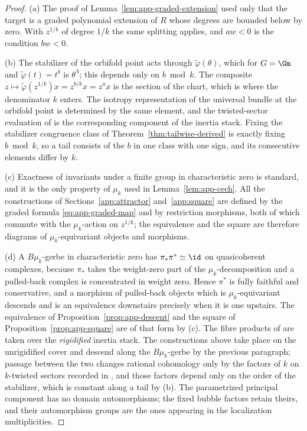 \begin{proof}
(a)  The proof of Lemma~\ref{lem:app-graded-extension} used only that the
target is a graded polynomial extension of \(R\) whose degrees are bounded
below by zero.  With \(z^{1/k}\) of degree \(1/k\) the same splitting applies,
and \(aw<0\) is the condition \(bw<0\).

(b)  The stabilizer of the orbifold point acts through
\(\widetilde\varphi(\theta)\), which for \(G=\Gm\) and
\(\widetilde\varphi(t)=t^{b}\) is \(\theta^{\,b}\); this depends only on
\(b\bmod k\).  The composite
\(z\mapsto\widetilde\varphi(z^{1/k})x=z^{b/k}x=z^ax\) is the section of the
chart, which is where the denominator \(k\) enters.  The isotropy representation of the universal bundle at the
orbifold point is determined by the same element, and the twisted-sector
evaluation of \cite[Corollary~9.10]{WoodwardQKIII} is the corresponding
component of the inertia stack.  Fixing the stabilizer congruence class of
Theorem~\ref{thm:tailwise-derived} is exactly fixing \(b\bmod k\), so a tail
consists of the \(b\) in one class with one sign, and its consecutive elements
differ by \(k\).

(c)  Exactness of invariants under a finite group in characteristic zero is
standard, and it is the only property of \(\mu_k\) used in
Lemma~\ref{lem:app-cech}.  All the constructions of
Sections~\ref{app:attractor} and~\ref{app:square} are defined by the graded
formula \eqref{eq:app-graded-map} and by restriction morphisms, both of which
commute with the \(\mu_k\)-action on \(z^{1/k}\); the equivalence and the
square are therefore diagrams of \(\mu_k\)-equivariant objects and morphisms.

(d)  A \(B\mu_k\)-gerbe in characteristic zero has \(\pi_*\pi^*\simeq\id\) on
quasicoherent complexes, because \(\pi_*\) takes the weight-zero part of the
\(\mu_k\)-decomposition and a pulled-back complex is concentrated in weight
zero.  Hence \(\pi^*\) is fully faithful and conservative, and a morphism of
pulled-back objects which is \(\mu_k\)-equivariant descends and is an
equivalence downstairs precisely when it is one upstairs.  The equivalence of
Proposition~\ref{prop:app-descent} and the square of
Proposition~\ref{prop:app-square} are of that form by (c).  The fibre products
of \cite[equations~(54) and~(57)]{WoodwardQKIII} are taken over the
\emph{rigidified} inertia stack.  The constructions above take place on the
unrigidified cover and descend along the \(B\mu_k\)-gerbe by the previous
paragraph; passage between the two changes
rational cohomology only by the factors of \(k\) on \(k\)-twisted sectors
recorded in \cite[Example~4.3(f),(g)]{WoodwardQKII}, and those factors
depend only on the order of the stabilizer, which is constant along a tail by
(b).  The parametrized principal component has no domain automorphisms; the
fixed bubble factors retain theirs, and their automorphism groups are the ones
appearing in the localization multiplicities.
\end{proof}

